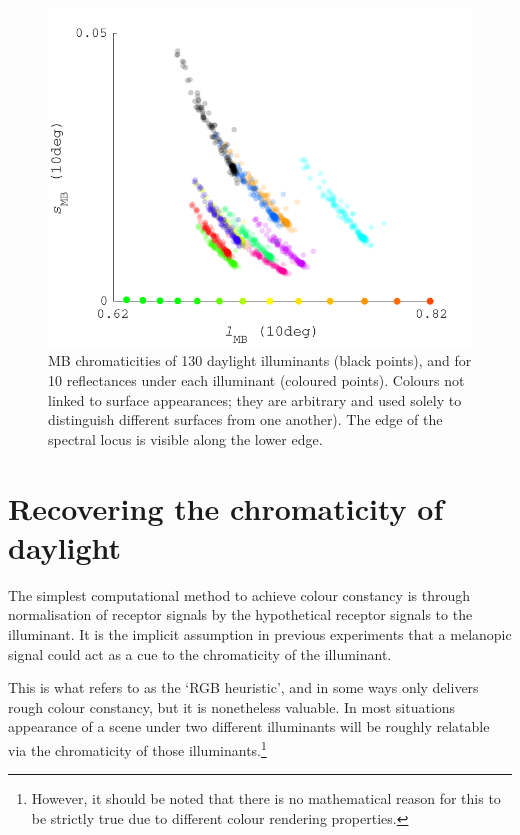 \begin{figure}[htbp]
    \includegraphics[max width=\textwidth]{figs/comp/predictingChromaticity/BasicMB_2.pdf}
    \caption{\gls{MB} chromaticities of 130 daylight illuminants (black points), and for 10 reflectances under each illuminant (coloured points). Colours not linked to surface appearances; they are arbitrary and used solely to distinguish different surfaces from one another). The edge of the spectral locus is visible along the lower edge.}
    \label{fig:MB}
\end{figure} 


\section{Recovering the chromaticity of daylight}

The simplest computational method to achieve colour constancy is through normalisation of receptor signals by the hypothetical receptor signals to the illuminant. It is the implicit assumption in previous experiments that a melanopic signal could act as a cue to the chromaticity of the illuminant.

This is what \citet{maloney_physics-based_2001} refers to as the `RGB heuristic', and in some ways only delivers rough colour constancy, but it is nonetheless valuable. In most situations appearance of a scene under two different illuminants will be roughly relatable via the chromaticity of those illuminants.\footnote{However, it should be noted that there is no mathematical reason for this to be strictly true due to different colour rendering properties.}

